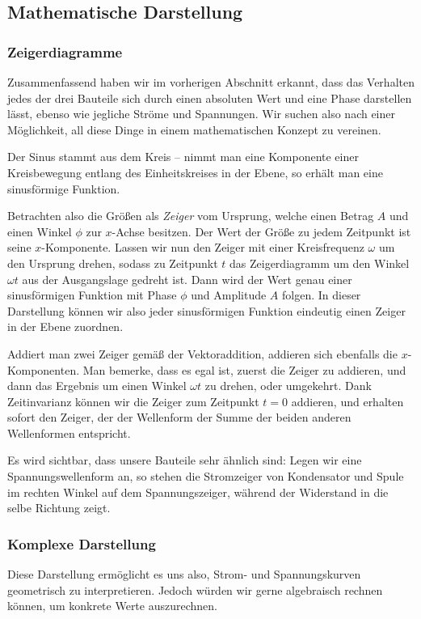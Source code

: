 \subsection{Mathematische Darstellung}
\subsubsection{Zeigerdiagramme}
Zusammenfassend haben wir im vorherigen Abschnitt erkannt, dass das Verhalten jedes der drei Bauteile sich durch einen
absoluten Wert und eine Phase darstellen lässt, ebenso wie jegliche Ströme und Spannungen. Wir suchen also nach einer
Möglichkeit, all diese Dinge in einem mathematischen Konzept zu vereinen.

Der Sinus stammt aus dem Kreis -- nimmt man eine Komponente einer Kreisbewegung entlang des Einheitskreises in der
Ebene, so erhält man eine sinusförmige Funktion.

Betrachten also die Größen als \emph{Zeiger} vom Ursprung, welche einen Betrag $A$ und einen Winkel $\phi$ zur $x$-Achse
besitzen.  Der Wert der Größe zu jedem Zeitpunkt ist seine $x$-Komponente. Lassen wir nun den Zeiger mit einer
Kreisfrequenz $\omega$ um den Ursprung drehen, sodass zu Zeitpunkt $t$ das Zeigerdiagramm um den Winkel $\omega t$ aus
der Ausgangslage gedreht ist. Dann wird der Wert genau einer sinusförmigen Funktion mit Phase $\phi$
und Amplitude $A$ folgen. In dieser Darstellung können wir also jeder sinusförmigen Funktion eindeutig einen Zeiger in
der Ebene zuordnen.

Addiert man zwei Zeiger gemäß der Vektoraddition, addieren sich ebenfalls die $x$-Komponenten. Man bemerke, dass es egal
ist, zuerst die Zeiger zu addieren, und dann das Ergebnis um einen Winkel $\omega t$ zu drehen, oder umgekehrt. Dank
Zeitinvarianz können wir die Zeiger zum Zeitpunkt $t = 0$ addieren, und erhalten sofort den Zeiger, der der Wellenform
der Summe der beiden anderen Wellenformen entspricht.

Es wird sichtbar, dass unsere Bauteile sehr ähnlich sind: Legen wir eine Spannungswellenform an, so stehen die
Stromzeiger von Kondensator und Spule im rechten Winkel auf dem Spannungszeiger, während der Widerstand in die selbe
Richtung zeigt.
\subsubsection{Komplexe Darstellung}
Diese Darstellung ermöglicht es uns also, Strom- und Spannungskurven geometrisch zu interpretieren. Jedoch würden wir gerne
algebraisch rechnen können, um konkrete Werte auszurechnen.

